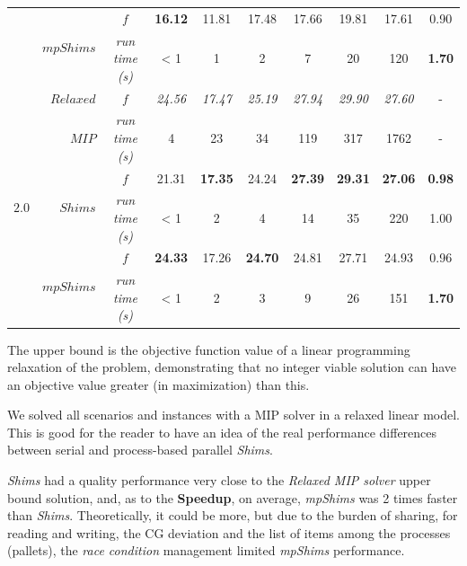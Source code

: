 \documentclass[preprint,authoryear]{elsarticle}
\begin{document}
\begin{table}[H]
\begin{tabular}{crcccccccc}
        \cmidrule{2-10}		                      
        &\multirow{2}{*}{ $mpShims$}      & $f$                &{\bf 16.12}&     11.81 &     17.48 &  17.66    &   19.81   &  17.61    &  0.90 \\%
        &                                 & {\it run time (s)} &     < 1   &     1     &     2     &     7     &   20      &  120      &  {\bf 1.70}\\%
		\toprule
		\multirow{7}{*}{$2.0$}&$Relaxed$  & $f$                &{\it 24.56}&{\it 17.47}&{\it 25.19}&{\it 27.94}&{\it 29.90}&{\it 27.60}& -\\%
		&                       $MIP$     & {\it run time (s)} &     4     &     23    &    34     &   119     &     317      &   1762        & -\\%
		\cmidrule{2-10}		                       
		&\multirow{2}{*}{ $Shims$}        & $f$                &    21.31  &{\bf 17.35}&   24.24   &{\bf 27.39}&{\bf 29.31}&{\bf 27.06}&{\bf 0.98}  \\%
		&                                 & {\it run time (s)} &     < 1   &     2     &     4     &     14    &     35    &   220     &  1.00 \\%
		\cmidrule{2-10}		                       
		&\multirow{2}{*}{ $mpShims$}      & $f$                &{\bf 24.33}&   17.26   &{\bf 24.70}&   24.81   &   27.71   &  24.93    &  0.96  \\%
		&                                 & {\it run time (s)} &     < 1   &     2     &     3     &     9     &   26      &  151      &  {\bf 1.70}\\%
		\bottomrule	
	\end{tabular}
	\normalsize
\end{table}



The upper bound is the objective function value of a linear programming relaxation of the problem, demonstrating that no integer viable solution can have an objective value greater (in maximization) than this.

We solved all scenarios and instances with a MIP solver in a relaxed linear model. This is good for the reader to have an idea of the real performance differences between serial and process-based parallel {\it Shims}.

{\it Shims} had a quality performance very close to the {\it Relaxed MIP solver} upper bound solution, and, as to the {\bf Speedup}, on average, {\it mpShims} was 2 times faster than {\it Shims}. Theoretically, it could be more, but due to the burden of sharing, for reading and writing, the CG deviation and the list of items among the processes (pallets), the {\it race condition} management limited {\it mpShims} performance.
\end{document}
